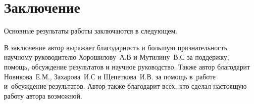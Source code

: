 \chapter*{Заключение}						%


Основные результаты работы заключаются в следующем.


В заключение автор
выражает благодарность и большую признательность научному руководителю
Хорошилову~А.\:В и Мутилину~В.\:С за поддержку, помощь, обсуждение результатов и научное
руководство.
Также автор благодарит Новикова~Е.\:М., Захарова~И.\:С и Щепеткова~И.\:В. за
помощь в~работе и~обсуждение результатов.
Автор также благодарит всех, кто сделал настоящую работу автора возможной.

